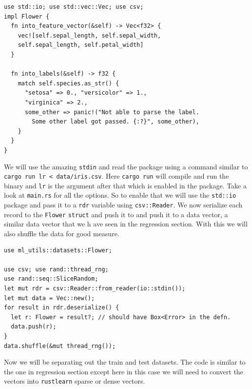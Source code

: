 \documentclass{book}
\begin{document}
\begin{lstlisting}[caption={ml\\-utils\\/src\\/datasets\\.rs}]
use std::io; use std::vec::Vec; use csv;
impl Flower {
  fn into_feature_vector(&self) -> Vec<f32> {
    vec![self.sepal_length, self.sepal_width,
    self.sepal_length, self.petal_width]
  }

  fn into_labels(&self) -> f32 {
    match self.species.as_str() {
      "setosa" => 0., "versicolor" => 1.,
      "virginica" => 2.,
      some_other => panic!("Not able to parse the label.
        Some other label got passed. {:?}", some_other),
    }
  }
}
\end{lstlisting}

We will use the amazing \lstinline{stdin} and read the package using a command similar to \lstinline{cargo run lr < data/iris.csv}. Here \lstinline{cargo run} will compile and run the binary and \lstinline{lr} is the argument after that which is enabled in the package. Take a look at \lstinline{main.rs} for all the options. So to enable that we will use the \lstinline{std::io} package and pass it to a \lstinline{rdr} variable using \lstinline{csv::Reader}. We now serialize each record to the \lstinline{Flower} \lstinline{struct} and push it to and push it to a data vector, a similar data vector that we h ave seen in the regression section. With this we will also shuffle the data for good measure.

\begin{lstlisting}[caption={chapter3\\/rustlearn\_classification\_tasks\\/src\\/logistic\_reg\\.rs}]
use ml_utils::datasets::Flower;

use csv; use rand::thread_rng;
use rand::seq::SliceRandom;
let mut rdr = csv::Reader::from_reader(io::stdin());
let mut data = Vec::new();
for result in rdr.deserialize() {
  let r: Flower = result?; // should have Box<Error> in the defn.
  data.push(r);
}
data.shuffle(&mut thread_rng());
\end{lstlisting}

Now we will be separating out the train and test datasets. The code is similar to the one in regression section except here in this case we will need to convert the vectors into \lstinline{rustlearn} sparse or dense vectors.
\end{document}
